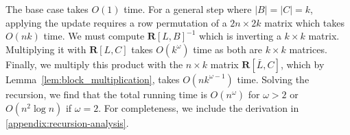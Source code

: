 \documentclass{article}
\newcommand{\matsize}[2]{#1\times #2}
\newcommand{\matexp}{\omega}
\newcommand{\mat}[1]{\mathbf{#1}}
\begin{document}
The base case takes $O(1)$ time. For a general step where $|B|=|C|=k$,  applying
the update requires a row permutation of a $\matsize{2n}{2k}$ matrix which takes
$O(nk)$ time. We must compute $\mat{R}[L,B]^{-1}$ which is inverting a $\matsize{k}{k}$ matrix.   Multiplying it with $\mat{R}[L,C]$  takes $O(k^{\matexp})$ time as both are $\matsize{k}{k}$ matrices. Finally, we 
multiply this product with the $\matsize{n}{k}$ matrix $\mat{R}[\bar{L},C]$, which by Lemma~\ref{lem:block_multiplication}, takes
$O(nk^{\matexp-1})$ time.
Solving
the recursion, we find that the total running time is  $O(n^{\matexp})$ for
$\matexp>2$ or $O(n^2\log n)$ if $\matexp=2$. For completeness, we include the
derivation in  \cref{appendix:recursion-analysis}.
\end{document}

